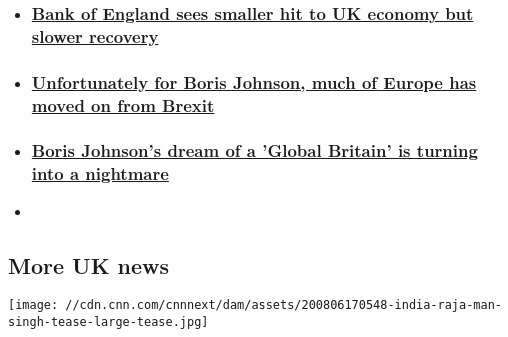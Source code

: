 \begin{itemize}
\item
  \hypertarget{bank-of-england-sees-smaller-hit-to-uk-economy-but-slower-recovery}{%
  \subsubsection{\texorpdfstring{\href{/2020/08/06/economy/bank-of-england-uk-economy/index.html}{Bank
  of England sees smaller hit to UK economy but slower
  recovery}}{Bank of England sees smaller hit to UK economy but slower recovery}}\label{bank-of-england-sees-smaller-hit-to-uk-economy-but-slower-recovery}}
\item
  \hypertarget{unfortunately-for-boris-johnson-much-of-europe-has-moved-on-from-brexit}{%
  \subsubsection{\texorpdfstring{\href{/2020/07/29/uk/eu-brexit-intl-gbr/index.html}{Unfortunately
  for Boris Johnson, much of Europe has moved on from
  Brexit}}{Unfortunately for Boris Johnson, much of Europe has moved on from Brexit}}\label{unfortunately-for-boris-johnson-much-of-europe-has-moved-on-from-brexit}}
\item
  \hypertarget{boris-johnsons-dream-of-a-global-britain-is-turning-into-a-nightmare}{%
  \subsubsection{\texorpdfstring{\href{/2020/07/24/business/brexit-trade-deals-boris-johnson/index.html}{Boris
  Johnson's dream of a 'Global Britain' is turning into a
  nightmare}}{Boris Johnson's dream of a 'Global Britain' is turning into a nightmare}}\label{boris-johnsons-dream-of-a-global-britain-is-turning-into-a-nightmare}}
\end{itemize}

\begin{itemize}
\item
\end{itemize}

\hypertarget{more-uk-news}{%
\subsection{More UK news}\label{more-uk-news}}

\href{/2020/08/07/asia/india-maharaja-police-sentence-intl-dst-hnk/index.html}{}

\texttt{[image: //cdn.cnn.com/cnnnext/dam/assets/200806170548-india-raja-man-singh-tease-large-tease.jpg]}

